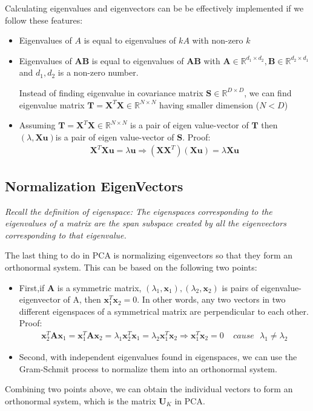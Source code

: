 \documentclass[a4paper, 12pt]{report}
\begin{document}
\indent \par Calculating eigenvalues and eigenvectors can be be effectively implemented if we follow these features: 
\begin{itemize}
\item Eigenvalues of $A$ is equal to eigenvalues of $kA$ with non-zero $k$
\item Eigenvalues of $\mathbf{AB}$ is equal to eigenvalues of $\mathbf{AB}$ with $ \mathbf{A} \in \mathbb{R}^{d_1 \times d_2}, \mathbf{B} \in \mathbb{R} ^{d_2 \times d_1} $ and $d_1, d_2$ is a non-zero number. 
\indent \par Instead of finding eigenvalue in covariance matrix $\mathbf{S} \in \mathbb{R}^{D\times D}$, we can find eigenvalue matrix $\mathbf{T} = \mathbf{X}^T \mathbf{X} \in \mathbb{R}^{N \times N} $ having smaller dimension ($N < D$)
\item Assuming $\mathbf{T} = \mathbf{X}^T \mathbf{X} \in \mathbb{R}^{N \times N}$ is a pair of eigen value-vector of $\mathbf{T} $ then $(\lambda, \mathbf{Xu})$is a pair of eigen value-vector of  $\mathbf{S}$. Proof: \begin{eqnarray*}
  \mathbf{X}^T \mathbf{Xu} = \lambda \mathbf{u} \Rightarrow (\mathbf{X}\mathbf{X}^T)(\mathbf{Xu}) = \lambda \mathbf{Xu}
\end{eqnarray*}
\end{itemize}

\subsection{Normalization EigenVectors}
\indent \par \textit{Recall the definition of eigenspace: The eigenspaces corresponding to the eigenvalues of a matrix are the span subspace created by all the eigenvectors corresponding to that eigenvalue.}

\indent \par The last thing to do in PCA is normalizing eigenvectors so that they form an orthonormal system. This can be based on the following two points:
\begin{itemize}
    \item First,if $\mathbf{A}$ is a symmetric matrix, $(\lambda_1, \mathbf{x}_1), (\lambda_2, \mathbf{x}_2)$ is pairs of eigenvalue-eigenvector of A, then $\mathbf{x}_1^T\mathbf{x}_2 = 0$. In other words, any two vectors in two different eigenspaces of a symmetrical matrix are perpendicular to each other. Proof: 
\begin{eqnarray*}
  \mathbf{x}_2^T \mathbf{Ax}_1 = \mathbf{x}_1^T \mathbf{Ax}_2 = \lambda_1 \mathbf{x}_2^T \mathbf{x}_1 = \lambda_2 \mathbf{x}_1^T \mathbf{x}_2 \Rightarrow \mathbf{x}_1^T \mathbf{x}_2 = 0 ~~~~~ cause ~~~\lambda_1 \neq \lambda_2 
\end{eqnarray*}
\item Second, with independent eigenvalues found in eigenspaces, we can use the Gram-Schmit process to normalize them into an orthonormal system.
\end{itemize}
\indent \par Combining two points above, we can obtain the individual vectors to form an orthonormal system, which is the matrix $\mathbf{U}_K$ in PCA.
\end{document}

